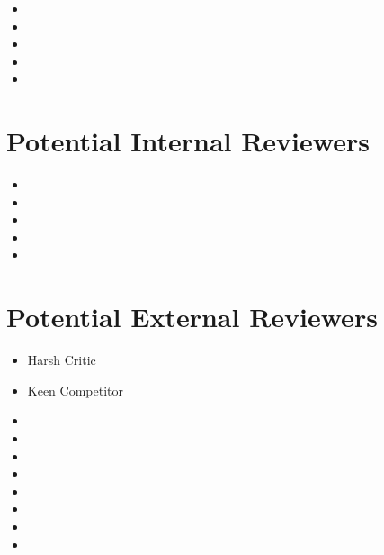 \documentclass[11pt,letterpaper]{article}
\begin{document}
\begin{itemize}
\item 

\item 

\item 

\item 

\item 
\end{itemize}


\section{Potential Internal Reviewers}
\label{sec:orgd669bc4}

\begin{itemize}
\item 

\item 

\item 

\item 

\item 
\end{itemize}

\section{Potential External Reviewers}
\label{sec:orgc23bf44}

\begin{itemize}
\item Harsh Critic
\item Keen Competitor
\item 

\item 

\item 

\item 

\item 

\item 

\item 

\item 
\end{itemize}
\end{document}
